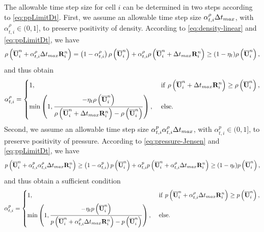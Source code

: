 The allowable time step size for cell $i$ can be determined in two steps according to \eqref{eq:ppLimitDt}.
First, we assume an allowable time step size
$\alpha_{t,i}^{\rho} \mathrm\Delta t_{max}$, with $\alpha_{t,i}^{\rho} \in (0,1]$, to preserve positivity of density. According to \eqref{eq:density-linear} and \eqref{eq:ppLimitDt}, we have
\begin{equation}
    \rho\left(\overline{\mathbf{U}}^n_i + \alpha_{t,i}^{\rho} \mathrm\Delta t_{max} \mathbf{R}^n_i\right)= \left(1- \alpha_{t,i}^{\rho}\right)\rho\left(\overline{\mathbf{U}}^n_i\right) + \alpha_{t,i}^{\rho} \rho\left(\overline{\mathbf{U}}^n_i + \mathrm\Delta t_{max} \mathbf{R}^n_i\right)  \geq
    (1- \eta_t)
    \rho\left(\overline{\mathbf{U}}_i^n\right),
\end{equation}
and thus obtain
\begin{equation}
    \alpha_{t,i}^{\rho} = \begin{dcases}
        1,                                                                                                                                         & \ \mathrm{if} \ \rho\left(\overline{\mathbf{U}}^n_i + \mathrm\Delta t_{max} \mathbf{R}^n_i\right) \geq  \rho\left(\overline{\mathbf{U}}^n_i\right), \\
        \min\left(1, \dfrac{-\eta_t \rho\left(\overline{\mathbf{U}}^n_i\right)}{\rho \left(\overline{\mathbf{U}}^n_i + \mathrm\Delta t_{max} \mathbf{R}^n_i\right)-  \rho\left(\overline{\mathbf{U}}^n_i\right)} \right), & \
        \mathrm{else}.
    \end{dcases}
\end{equation}
Second, we assume an allowable time step size
$\alpha_{t,i}^{p}  \alpha_{t,i}^{\rho} \mathrm\Delta t_{max}$, with $\alpha_{t,i}^{p} \in (0,1]$,
to preserve positivity of pressure. According to \eqref{eq:pressure-Jensen} and \eqref{eq:ppLimitDt}, we have
\begin{equation}
    p\left(\overline{\mathbf{U}}^n_i +  \alpha_{t,i}^{p} \alpha_{t,i}^{\rho} \mathrm\Delta t_{max} \mathbf{R}^n_i\right) \geq \left(1-\alpha_{t,i}^{p}\right)p\left(\overline{\mathbf{U}}^n_i\right) + \alpha_{t,i}^{p} p\left(\overline{\mathbf{U}}^n_i + \alpha_{t,i}^{\rho} \mathrm\Delta t_{max} \mathbf{R}^n_i\right) \geq
    (1- \eta_t)
    p\left(\overline{\mathbf{U}}_i^n\right),
\end{equation}
and thus obtain a sufficient condition
\begin{equation}
    \alpha_{t,i}^{p} = \begin{dcases}
        1,                                                                                                                                                       & \ \mathrm{if} \ p \left(\UM^n_i + \alpha_{t,i}^{\rho} \inc t_{max} \R^n_i\right) \geq  p \left(\UM^n_i\right), \\
        \min\left(1, \dfrac{-\eta_t p \left(\UM^n_i\right)}{p \left(\UM^n_i +  \alpha_{t,i}^{\rho} \inc t_{max} \R^n_i\right)-  p \left(\UM^n_i\right)} \right), & \                                                                                                              %
        \mathrm{else}.
    \end{dcases}
\end{equation}
